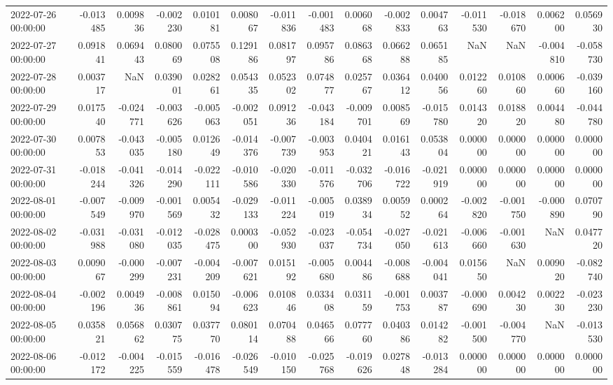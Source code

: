 \begin{tabular}{lrrrrrrrrrrrrrr}
2022-07-26 00:00:00 & -0.013485 & 0.009836 & -0.002230 & 0.010181 & 0.008067 & -0.011836 & -0.001483 & 0.006068 & -0.002833 & 0.004763 & -0.011530 & -0.018670 & 0.006200 & 0.056930 \\
2022-07-27 00:00:00 & 0.091841 & 0.069443 & 0.080069 & 0.075508 & 0.129186 & 0.081797 & 0.095786 & 0.086368 & 0.066288 & 0.065185 & NaN & NaN & -0.004810 & -0.058730 \\
2022-07-28 00:00:00 & 0.003717 & NaN & 0.039001 & 0.028261 & 0.054335 & 0.052302 & 0.074877 & 0.025767 & 0.036412 & 0.040056 & 0.012260 & 0.010860 & 0.000660 & -0.039160 \\
2022-07-29 00:00:00 & 0.017540 & -0.024771 & -0.003626 & -0.005063 & -0.002051 & 0.091236 & -0.043184 & -0.009701 & 0.008569 & -0.015780 & 0.014320 & 0.018820 & 0.004480 & -0.044780 \\
2022-07-30 00:00:00 & 0.007853 & -0.043035 & -0.005180 & 0.012649 & -0.014376 & -0.007739 & -0.003953 & 0.040421 & 0.016143 & 0.053804 & 0.000000 & 0.000000 & 0.000000 & 0.000000 \\
2022-07-31 00:00:00 & -0.018244 & -0.041326 & -0.014290 & -0.022111 & -0.010586 & -0.020330 & -0.011576 & -0.032706 & -0.016722 & -0.021919 & 0.000000 & 0.000000 & 0.000000 & 0.000000 \\
2022-08-01 00:00:00 & -0.007549 & -0.009970 & -0.001569 & 0.005432 & -0.029133 & -0.011224 & -0.005019 & 0.038934 & 0.005952 & 0.000264 & -0.002820 & -0.001750 & -0.000890 & 0.070790 \\
2022-08-02 00:00:00 & -0.031988 & -0.031080 & -0.012035 & -0.028475 & 0.000300 & -0.052930 & -0.023037 & -0.054734 & -0.027050 & -0.021613 & -0.006660 & -0.001630 & NaN & 0.047720 \\
2022-08-03 00:00:00 & 0.009067 & -0.000299 & -0.007231 & -0.004209 & -0.007621 & 0.015192 & -0.005680 & 0.004486 & -0.008688 & -0.004041 & 0.015650 & NaN & 0.009020 & -0.082740 \\
2022-08-04 00:00:00 & -0.002196 & 0.004936 & -0.008861 & 0.015094 & -0.006623 & 0.010846 & 0.033408 & 0.031159 & -0.001753 & 0.003787 & -0.000690 & 0.004230 & 0.002230 & -0.023230 \\
2022-08-05 00:00:00 & 0.035821 & 0.056862 & 0.030775 & 0.037770 & 0.080114 & 0.070488 & 0.046566 & 0.077760 & 0.040386 & 0.014282 & -0.001500 & -0.004770 & NaN & -0.013530 \\
2022-08-06 00:00:00 & -0.012172 & -0.004225 & -0.015559 & -0.016478 & -0.026549 & -0.010150 & -0.025768 & -0.019626 & 0.027848 & -0.013284 & 0.000000 & 0.000000 & 0.000000 & 0.000000 \\

\end{tabular}
